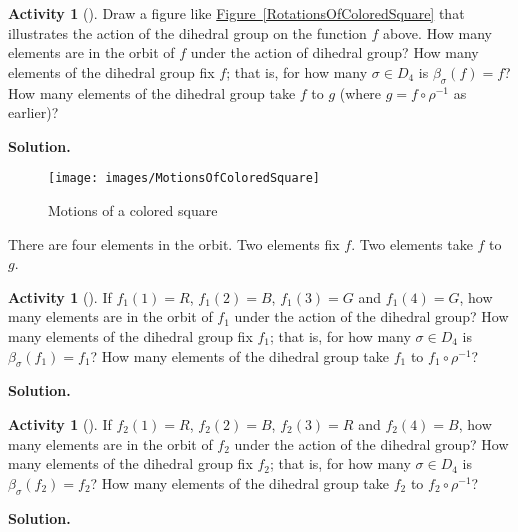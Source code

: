 \documentclass[10pt,]{book}
\theoremstyle{plain}
\theoremstyle{definition}
\newtheorem{activity}[project]{Activity}
\numberwithin{equation}{chapter}
\begin{document}
\begin{activity}[]\label{dihedralorbits1}
Draw a figure like \hyperref[RotationsOfColoredSquare]{Figure~\ref{RotationsOfColoredSquare}} that illustrates the action of the dihedral group on the function \(f\) above. How many elements are in the orbit of \(f\) under the action of dihedral group? How many elements of the dihedral group fix \(f\); that is, for how many \(\sigma \in D_4\) is \(\beta_{\sigma}(f) =
f\)? How many elements of the dihedral group take \(f\) to \(g\) (where \(g=f\circ
\rho^{-1}\) as earlier)?%
\par\medskip\noindent%
\textbf{Solution.}\quad \leavevmode%
\begin{figure}
\centering
\texttt{[image: images/MotionsOfColoredSquare]}
\caption{Motions of a colored square\label{MotionsOfColoredSquare}}
\end{figure}
There are four elements in the orbit. Two elements fix \(f\). Two elements take \(f\) to \(g\).%
\end{activity}
\begin{activity}[]\label{dihedralorbits2}
If \(f_1(1)=R\), \(f_1(2) = B\), \(f_1(3) = G\) and \(f_1(4) = G\), how many elements are in the orbit of \(f_1\) under the action of the dihedral group? How many elements of the dihedral group fix \(f_1\); that is, for how many \(\sigma \in D_4\) is \(\beta_{\sigma}(f_1) =
f_1\)? How many elements of the dihedral group take \(f_1\) to \(f_1\circ\rho^{-1}\)?%
\par\medskip\noindent%
\textbf{Solution.}\quad \end{activity}
\begin{activity}[]\label{dihedralorbits3}
If \(f_2(1)=R\), \(f_2(2) = B\), \(f_2(3) = R\) and \(f_2(4) = B\), how many elements are in the orbit of \(f_2\) under the action of the dihedral group? How many elements of the dihedral group fix \(f_2\); that is, for how many \(\sigma \in D_4\) is \(\beta_{\sigma}(f_2) =
f_2\)? How many elements of the dihedral group take \(f_2\) to \(f_2\circ\rho^{-1}\)?%
\par\medskip\noindent%
\textbf{Solution.}\quad \end{activity}
\end{document}
